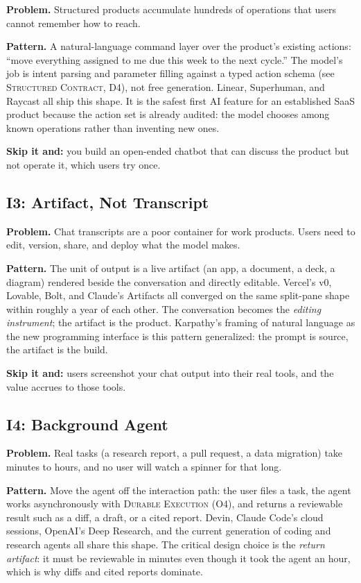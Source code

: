 \documentclass[11pt]{article}
\newcommand{\pat}[1]{\textsc{#1}}
\begin{document}
\textbf{Problem.} Structured products accumulate hundreds of operations that
users cannot remember how to reach.

\textbf{Pattern.} A natural-language command layer over the product's existing
actions: ``move everything assigned to me due this week to the next cycle.''
The model's job is intent parsing and parameter filling against a typed action
schema (see \pat{Structured Contract}, D4), not free generation. Linear,
Superhuman, and Raycast all ship this shape. It is the safest first AI feature
for an established SaaS product because the action set is already audited:
the model chooses among known operations rather than inventing new ones.

\textbf{Skip it and:} you build an open-ended chatbot that can discuss the
product but not operate it, which users try once.

\subsection{I3: Artifact, Not Transcript}

\textbf{Problem.} Chat transcripts are a poor container for work products.
Users need to edit, version, share, and deploy what the model makes.

\textbf{Pattern.} The unit of output is a live artifact (an app, a document, a
deck, a diagram) rendered beside the conversation and directly editable.
Vercel's v0, Lovable, Bolt, and Claude's Artifacts all converged on the same
split-pane shape within roughly a year of each other. The conversation becomes the
\emph{editing instrument}; the artifact is the product. Karpathy's framing of
natural language as the new programming interface \citep{karpathy2025software}
is this pattern generalized: the prompt is source, the artifact is the build.

\textbf{Skip it and:} users screenshot your chat output into their real tools,
and the value accrues to those tools.

\subsection{I4: Background Agent}

\textbf{Problem.} Real tasks (a research report, a pull request, a data
migration) take minutes to hours, and no user will watch a spinner for that
long.

\textbf{Pattern.} Move the agent off the interaction path: the user files a
task, the agent works asynchronously with \pat{Durable Execution} (O4), and
returns a reviewable result such as a diff, a draft, or a cited report.
Devin, Claude Code's cloud sessions, OpenAI's Deep Research, and the
current generation of coding and research agents all share this shape. The
critical design choice is the \emph{return artifact}: it must be reviewable in
minutes even though it took the agent an hour, which is why diffs and
cited reports dominate.
\end{document}
